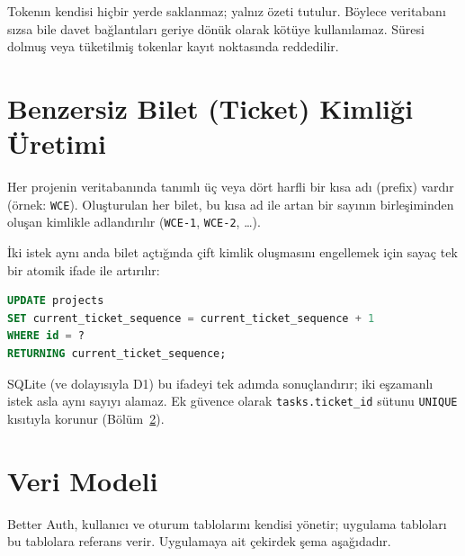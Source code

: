 \documentclass[11pt,a4paper]{article}
\begin{document}
\begin{mdframed}[linecolor=accent,linewidth=0.8pt,
                 backgroundcolor=lightgray,skipabove=10pt,skipbelow=10pt]
\small
Tokenın kendisi hiçbir yerde saklanmaz; yalnız özeti tutulur. Böylece
veritabanı sızsa bile davet bağlantıları geriye dönük olarak
kötüye kullanılamaz. Süresi dolmuş veya tüketilmiş tokenlar kayıt
noktasında reddedilir.
\end{mdframed}

\section{Benzersiz Bilet (Ticket) Kimliği Üretimi}

Her projenin veritabanında tanımlı üç veya dört harfli bir kısa adı
(prefix) vardır (örnek: \texttt{WCE}). Oluşturulan her bilet, bu kısa
ad ile artan bir sayının birleşiminden oluşan kimlikle adlandırılır
(\texttt{WCE-1}, \texttt{WCE-2}, \dots).

İki istek aynı anda bilet açtığında çift kimlik oluşmasını engellemek
için sayaç tek bir atomik ifade ile artırılır:

\begin{lstlisting}[language=SQL]
UPDATE projects
SET current_ticket_sequence = current_ticket_sequence + 1
WHERE id = ?
RETURNING current_ticket_sequence;
\end{lstlisting}

SQLite (ve dolayısıyla D1) bu ifadeyi tek adımda sonuçlandırır; iki
eşzamanlı istek asla aynı sayıyı alamaz. Ek güvence olarak
\texttt{tasks.ticket\_id} sütunu \texttt{UNIQUE} kısıtıyla korunur
(Bölüm~\ref{sec:verimodeli}).

\section{Veri Modeli}
\label{sec:verimodeli}

Better Auth, kullanıcı ve oturum tablolarını kendisi yönetir; uygulama
tabloları bu tablolara referans verir. Uygulamaya ait çekirdek şema
aşağıdadır.
\end{document}
